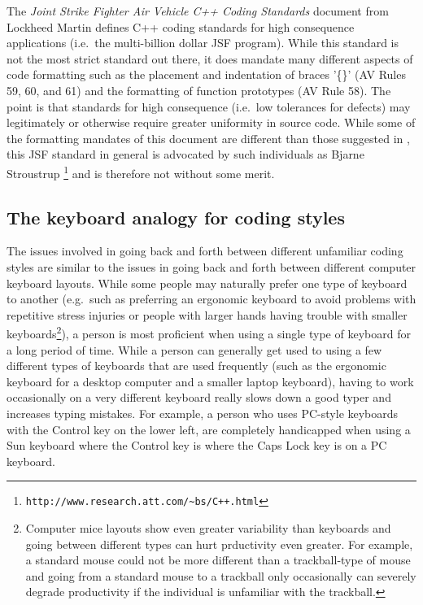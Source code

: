 The {}\textit{Joint Strike Fighter Air Vehicle C++ Coding Standards} document
{}\cite{JSFAVC++CodingStandards2005} from Lockheed Martin defines C++ coding
standards for high consequence applications (i.e.\ the multi-billion dollar
JSF program).  While this standard is not the most strict standard out there,
it does mandate many different aspects of code formatting such as the
placement and indentation of braces '\{\}' (AV Rules 59, 60, and 61) and the
formatting of function prototypes (AV Rule 58).  The point is that standards
for high consequence (i.e.\ low tolerances for defects) may legitimately or
otherwise require greater uniformity in source code.  While some of the
formatting mandates of this document are different than those suggested in
{}\cite[Chapter 31]{CodeComplete2nd04}, this JSF standard in general is
advocated by such individuals as Bjarne Stroustrup
{}\footnote{{}\texttt{http://www.research.att.com/\~{}bs/C++.html}} and is
therefore not without some merit.


%
\subsection{The keyboard analogy for coding styles}
%

The issues involved in going back and forth between different unfamiliar
coding styles are similar to the issues in going back and forth between
different computer keyboard layouts.  While some people may naturally prefer
one type of keyboard to another (e.g.\ such as preferring an ergonomic
keyboard to avoid problems with repetitive stress injuries or people with
larger hands having trouble with smaller keyboards\footnote{Computer mice
layouts show even greater variability than keyboards and going between
different types can hurt prductivity even greater.  For example, a standard
mouse could not be more different than a trackball-type of mouse and going
from a standard mouse to a trackball only occasionally can severely degrade
productivity if the individual is unfamiliar with the trackball.}), a person
is most proficient when using a single type of keyboard for a long period of
time.  While a person can generally get used to using a few different types of
keyboards that are used frequently (such as the ergonomic keyboard for a
desktop computer and a smaller laptop keyboard), having to work occasionally
on a very different keyboard really slows down a good typer and increases
typing mistakes.  For example, a person who uses PC-style keyboards with the
Control key on the lower left, are completely handicapped when using a Sun
keyboard where the Control key is where the Caps Lock key is on a PC keyboard.

